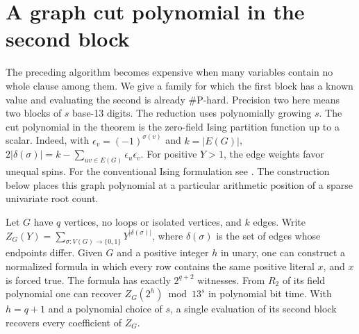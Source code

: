 \section{A graph cut polynomial in the second block}
The preceding algorithm becomes expensive when many variables contain
no whole clause among them. We give a family for which the first
block has a known value and evaluating the second is already
\(\#\mathrm P\)-hard. Precision two here means two blocks of \(s\)
base-13 digits. The reduction uses polynomially growing \(s\).
The cut polynomial in the theorem is the zero-field Ising partition
function up to a scalar. Indeed, with
\(\epsilon_v=(-1)^{\sigma(v)}\) and \(k=|E(G)|\),
\(2|\delta(\sigma)|=k-\sum_{uv\in E(G)}\epsilon_u\epsilon_v\).
For positive \(Y>1\), the edge weights favor unequal spins.
For the conventional Ising formulation see \cite{js}. The construction
below places this graph polynomial at a particular arithmetic position
of a sparse univariate root count.

\begin{theorem}\label{th:cuts}
Let \(G\) have \(q\) vertices, no loops or isolated vertices, and \(k\)
edges. Write \(Z_G(Y)=\sum_{\sigma:V(G)\to\{0,1\}}Y^{|\delta(\sigma)|}\),
where \(\delta(\sigma)\) is the set of edges whose endpoints differ.
Given \(G\) and a positive integer \(h\) in unary, one can construct
a normalized formula in which every row contains the same positive
literal \(x\), and \(x\) is forced true. The formula has exactly
\(2^{q+2}\) witnesses. From \(R_2\) of its field polynomial one can
recover \(Z_G(2^h)\bmod 13^s\) in polynomial bit time.
With \(h=q+1\) and a polynomial choice of \(s\), a single evaluation
of its second block recovers every coefficient of \(Z_G\).
\end{theorem}

